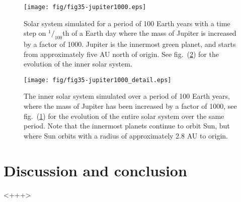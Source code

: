 \documentclass[a4paper,11pt]{article}
\begin{document}
\begin{figure}[hbt]
    \centering
    \texttt{[image: fig/fig35-jupiter1000.eps]}
    \caption{Solar system simulated for a period of 100 Earth years with a time step on $^1\!/_{100}$th of a Earth day where the mass of Jupiter is increased by a factor of 1000. Jupiter is the innermost green planet, and starts from approximately five AU north of origin. See fig.~(\ref{fig:35b}) for the evolution of the inner solar system.}
    \label{fig:35}
\end{figure}

\begin{figure}[htb]
    \centering
    \texttt{[image: fig/fig35-jupiter1000\_detail.eps]}
    \caption{The inner solar system simulated over a period of 100 Earth years, where the mass of Jupiter has been increased by a factor of 1000, see fig.~(\ref{fig:35}) for the evolution of the entire solar system over the same period. Note that the innermost planets continue to orbit Sun, but where Sun orbits with a radius of approximately 2.8 AU to origin.}
    \label{fig:35b}
\end{figure}

\section{Discussion and conclusion}<+++>



\end{document}
